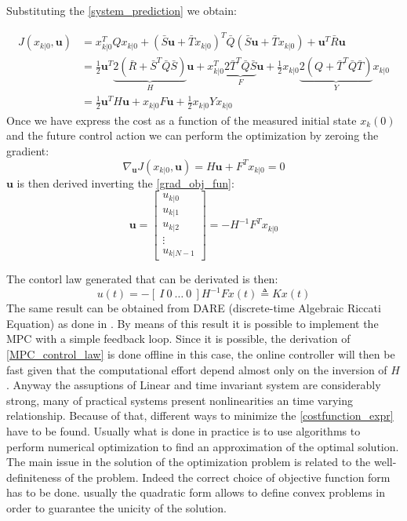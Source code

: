 Substituting the \ref{system_prediction} we obtain:

\begin{equation}\label{costfunction_expr}
\begin{split} 
 J(x_{k|0},\textbf{u})&=x_{k|0}^T Q x_{k|0} + (\bar{S}\textbf{u}+\bar{T}x_{k|0})^T\bar{Q}(\bar{S}\textbf{u}+\bar{T}x_{k|0}) + \textbf{u}^T\bar{R}\textbf{u} \\ 
 &= \frac{1}{2}\textbf{u}^T \underbrace{2(\bar{R}+\bar{S}^T\bar{Q}\bar{S})}_{H}\textbf{u} + x_{k|0}^T\underbrace{2\bar{T}^T\bar{Q}\bar{S}}_{F}\textbf{u}+\frac{1}{2}x_{k|0}\underbrace{2(Q+\bar{T}^T\bar{Q}\bar{T})}_{Y}x_{k|0} \\
 &=\frac{1}{2}\textbf{u}^TH\textbf{u}+x_{k|0}F\textbf{u}+\frac{1}{2}x_{k|0}Yx_{k|0}
 \end{split}
\end{equation}
Once we have express the cost as a function of the measured initial state $x_k(0)$ and the future control action we can perform the optimization by zeroing the gradient:
\begin{equation}
	\nabla_\textbf{u}J(x_{k|0},\textbf{u})=H\textbf{u}+F^Tx_{k|0}=0
\end{equation}
\label{grad_obj_fun}
$\textbf{u}$ is then derived inverting the \ref{grad_obj_fun}:
\begin{equation*}\label{MPC_control_law}
	\textbf{u}= \left[
	\begin{matrix}
			u_{k|0} \\ u_{k|1} \\ u_{k|2} \\ \vdots \\ u_{k|N-1}
	\end{matrix}\right] = -H^{-1}F^Tx_{k|0}
\end{equation*} 

The contorl law generated that can be derivated is then:
\begin{equation}
u(t)=-\left[\ I\ 0\ \dots\  0\ \right]H^{-1}Fx(t)\triangleq Kx(t)
\end{equation}
The same result can be obtained from DARE (discrete-time Algebraic Riccati Equation) as done in \cite{magni2006complementi}.
By means of this result it is possible to implement the MPC with a simple feedback loop. Since it is possible, the derivation of \ref{MPC_control_law} is done offline in this case, the online controller will then be fast given that the computational effort depend almost only on the inversion of $H$. 
Anyway the assuptions of Linear and time invariant system are considerably strong, many of practical systems present nonlinearities an time varying relationship. Because of that, different ways to minimize the \ref{costfunction_expr} have to be found.
Usually what is done in practice is to use algorithms to perform numerical optimization to find an approximation of the optimal solution. The main issue in the solution of the optimization problem is related to the well-definiteness of the problem. Indeed the correct choice of objective function form has to be done. usually the quadratic form allows to define convex problems in order to guarantee the unicity of the solution.

